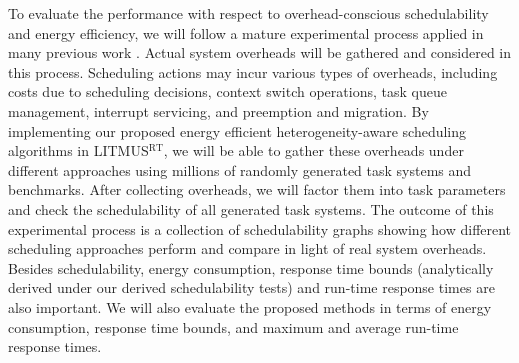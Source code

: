 To evaluate the performance with respect to overhead-conscious schedulability and energy efficiency, we will follow a mature experimental process applied in many previous work \cite{BBBdissertation, clustered, bastoni2010, calandrino2007, johndissertation}. Actual system overheads will be gathered and considered in this process. Scheduling actions may incur various types of overheads, including costs due to scheduling decisions, context switch operations, task queue management, interrupt servicing, and preemption and migration. By implementing our proposed energy efficient heterogeneity-aware scheduling algorithms in LITMUS$^{\textrm{RT}}$, we will be able to gather these overheads under different approaches using millions of randomly generated task systems and benchmarks.  After collecting overheads, we will factor them into task parameters and check the schedulability of all generated task systems. The outcome of this experimental process is a collection of schedulability graphs showing how different scheduling approaches perform and compare in light of real system overheads. Besides schedulability, energy consumption, response time bounds (analytically derived under our derived schedulability tests) and run-time response times are also important. We will also evaluate the proposed methods in terms of energy consumption, response time bounds, and maximum and average run-time response times.  